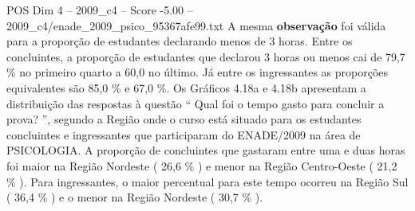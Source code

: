 \begin{textsample}{POS Dim 4 – 2009\_c4 – Score -5.00 – 2009\_c4/enade\_2009\_psico\_95367afe99.txt}
A mesma \textbf{observação} foi válida para a proporção de estudantes declarando menos de 3 horas.
Entre os concluintes, a proporção de estudantes que declarou 3 horas ou menos cai de 79,7 \% no primeiro quarto a 60,0 no último.
Já entre os ingressantes as proporções equivalentes são 85,0 \% e 67,0 \%.
Os Gráficos 4.18a e 4.18b apresentam a distribuição das respostas à questão “ Qual foi o tempo gasto para concluir a prova? ”, segundo a Região onde o curso está situado para os estudantes concluintes e ingressantes que participaram do ENADE/2009 na área de PSICOLOGIA.
A proporção de concluintes que gastaram entre uma e duas horas foi maior na Região Nordeste ( 26,6 \% ) e menor na Região Centro-Oeste ( 21,2 \% ).
Para ingressantes, o maior percentual para este tempo ocorreu na Região Sul ( 36,4 \% ) e o menor na Região Nordeste ( 30,7 \% ).

\end{textsample}
